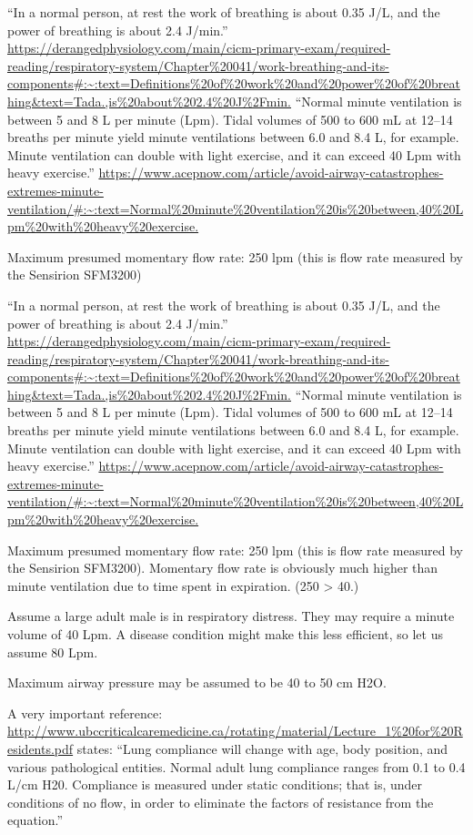 \documentclass{article}
\begin{document}
``In a normal person, at rest the work of breathing is about 0.35 J/L, and the power of breathing is about 2.4 J/min.''
\url{https://derangedphysiology.com/main/cicm-primary-exam/required-reading/respiratory-system/Chapter%20041/work-breathing-and-its-components#:~:text=Definitions%20of%20work%20and%20power%20of%20breathing&text=Tada.,is%20about%202.4%20J%2Fmin.}
  ``Normal minute ventilation is between 5 and 8 L per minute (Lpm). Tidal volumes of 500 to 600 mL at 12–14 breaths per minute yield minute ventilations between 6.0 and 8.4 L, for example. Minute ventilation can double with light exercise, and it can exceed 40 Lpm with heavy exercise.''
  \url{https://www.acepnow.com/article/avoid-airway-catastrophes-extremes-minute-ventilation/#:~:text=Normal%20minute%20ventilation%20is%20between,40%20Lpm%20with%20heavy%20exercise.}

    Maximum presumed momentary flow rate: 250 lpm (this is flow rate measured by the Sensirion SFM3200)



``In a normal person, at rest the work of breathing is about 0.35 J/L, and the power of breathing is about 2.4 J/min.''
\url{https://derangedphysiology.com/main/cicm-primary-exam/required-reading/respiratory-system/Chapter%20041/work-breathing-and-its-components#:~:text=Definitions%20of%20work%20and%20power%20of%20breathing&text=Tada.,is%20about%202.4%20J%2Fmin.}
  ``Normal minute ventilation is between 5 and 8 L per minute (Lpm). Tidal volumes of 500 to 600 mL at 12–14 breaths per minute yield minute ventilations between 6.0 and 8.4 L, for example. Minute ventilation can double with light exercise, and it can exceed 40 Lpm with heavy exercise.''
  \url{https://www.acepnow.com/article/avoid-airway-catastrophes-extremes-minute-ventilation/#:~:text=Normal%20minute%20ventilation%20is%20between,40%20Lpm%20with%20heavy%20exercise.}

    Maximum presumed momentary flow rate: 250 lpm (this is flow rate measured by the Sensirion SFM3200). Momentary flow rate is obviously much higher than minute ventilation
    due to time spent in expiration. (250 > 40.)

    Assume a large adult male is in respiratory distress. They may require a minute volume of 40 Lpm. A disease condition might make this less efficient, so let us
    assume 80 Lpm.

    Maximum airway pressure may be assumed to be 40 to 50 cm H2O.

    A very important reference:   \url{http://www.ubccriticalcaremedicine.ca/rotating/material/Lecture_1%20for%20Residents.pdf}
      states:
      ``Lung compliance will change with age, body position, and various pathological
entities. Normal adult lung compliance ranges from 0.1 to 0.4 L/cm H20. Compliance is
measured under static conditions; that is, under conditions of no flow, in order to
eliminate the factors of resistance from the equation.''
\end{document}
